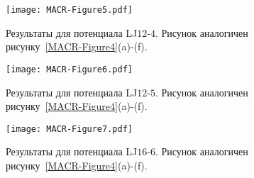 \begin{figure}
\centering
 \texttt{[image: MACR-Figure5.pdf]}
 \caption{Результаты для потенциала LJ$12$-$4$. Рисунок аналогичен рисунку~\ref{MACR-Figure4}(a)-(f).}
\label{MACR-Figure5}
\end{figure}


\begin{figure}
\centering
 \texttt{[image: MACR-Figure6.pdf]}
 \caption{Результаты для потенциала LJ$12$-$5$. Рисунок аналогичен рисунку~\ref{MACR-Figure4}(a)-(f).}
\label{MACR-Figure6}
\end{figure}


\begin{figure}
\centering
 \texttt{[image: MACR-Figure7.pdf]}
 \caption{Результаты для потенциала LJ$16$-$6$. Рисунок аналогичен рисунку~\ref{MACR-Figure4}(a)-(f).}
\label{MACR-Figure7}
\end{figure}
